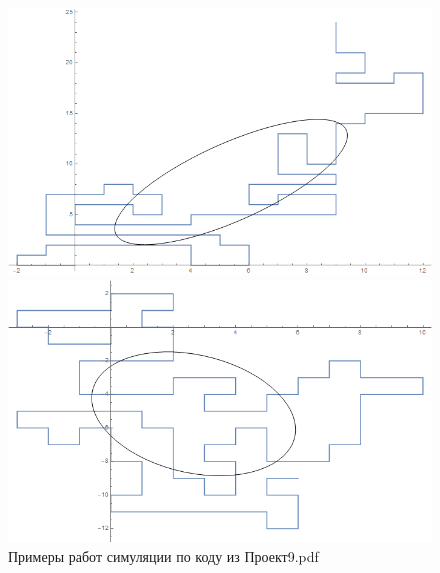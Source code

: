 \begin{figure}
\begin{minipage}[h]{0.5\linewidth}
     \includegraphics[width=\linewidth]{Sections/Images/GyrationEllipse3.png}
\end{minipage}
\hfill
\begin{minipage}[h]{0.5\linewidth}
    \includegraphics[width=\linewidth]{Sections/Images/GyrationEllipse4.png}
\end{minipage}
    \caption{Примеры работ симуляции по коду из Проект9.pdf\cite{Git}}
    \label{fig:my_label}
\end{figure}

